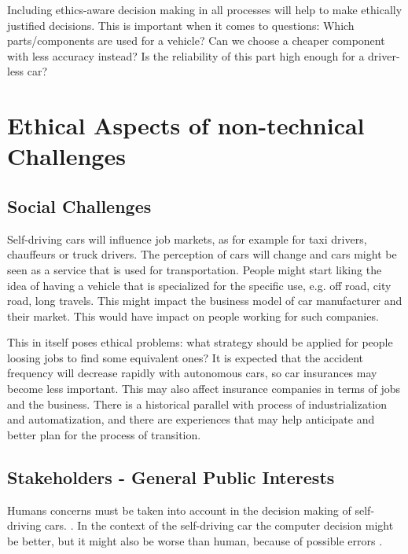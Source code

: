 Including ethics-aware decision making in all processes will help to make ethically justified decisions. This is important when it comes to questions: Which parts/components are used for a vehicle? Can we choose a cheaper component with less accuracy instead? Is the reliability of this part high enough for a driver-less car?



\section{Ethical Aspects of non-technical Challenges}
\label{sec:EAofNONTC}

\subsection{Social Challenges}
\label{sec:EAofNONTC:SocialChallenges}

Self-driving cars will influence job markets, as for example for taxi drivers, chauffeurs or truck drivers. The perception of cars will change and cars might be seen as a service that is used for transportation. People might start liking the idea of having a vehicle that is specialized for the specific use, e.g. off road, city road, long travels. This might impact the business model of car manufacturer and their market. This would have impact on people working for such companies.

This in itself poses ethical problems: what strategy should be applied for people loosing jobs to find some equivalent ones? It is expected that the accident frequency will decrease rapidly with autonomous cars, so car insurances may become less important. This may also affect insurance companies in terms of jobs and the business. There is a historical parallel with process of industrialization and automatization, and there are experiences that may help anticipate and better plan for the process of transition.


\subsection{Stakeholders - General Public Interests}
\label{sec:EAofNONTC:Stakeholders}

Humans concerns must be taken into account in the decision making of self-driving cars.  . In the context of the self-driving car the computer decision might be better, but it might also be worse than human, because of possible errors \cite{Eckstein2016}.

